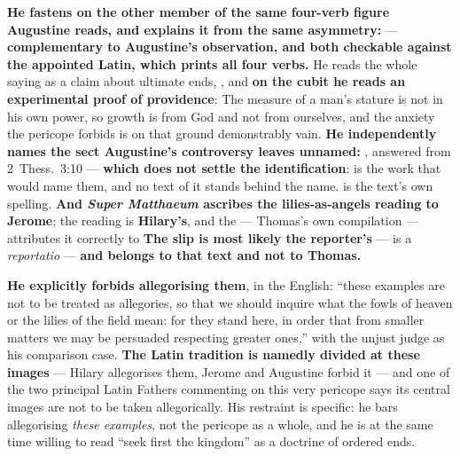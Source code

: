 \begin{witnessnote}
\textbf{He fastens on the other
member of the same four-verb figure Augustine reads, and explains it from the
same asymmetry:}  ---
\textbf{complementary to Augustine's  observation, and both
checkable against the appointed Latin, which prints all four verbs.} He reads
the whole saying as a claim about ultimate ends, , and \textbf{on the cubit he reads
an experimental proof of providence}:  The measure of a man's
stature is not in his own power, so growth is from God and not from ourselves,
and the anxiety the pericope forbids is on that ground demonstrably vain.
\textbf{He
independently names the sect Augustine's controversy leaves unnamed:}
, answered from 2~Thess.~3:10 --- \textbf{which does not
settle the identification}:  is the work that would name
them, and no text of it stands behind the name.  is
the text's own spelling. \textbf{And \emph{Super
Matthaeum} ascribes the lilies-as-angels reading to Jerome}; the reading is
\textbf{Hilary's},
and the  --- Thomas's own compilation --- attributes it
correctly to  \textbf{The slip is most likely the reporter's}
---  is a \emph{reportatio} --- \textbf{and belongs to
that text and not to Thomas.}
\end{witnessnote}

\begin{witnessnote}
 \textbf{He explicitly forbids allegorising them}, in the  English: ``these examples are not to be
treated as allegories, so that we should inquire what the fowls of heaven or the
lilies of the field mean: for they stand here, in order that from smaller
matters we may be persuaded respecting greater ones,'' with the unjust judge as
his comparison case. \textbf{The Latin tradition is namedly divided at these
images} --- Hilary allegorises them, Jerome and Augustine forbid it --- and one
of the two principal Latin Fathers commenting on this very pericope says its
central images are not to be taken allegorically. His restraint is specific: he
bars
allegorising \emph{these examples}, not the pericope as a whole, and he is at
the same time willing to read ``seek first the kingdom'' as a doctrine of
ordered ends.
\end{witnessnote}

